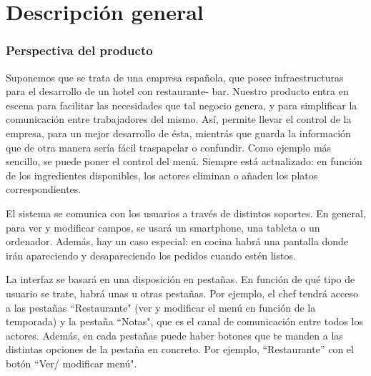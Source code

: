 \documentclass[spanish,a4paper,11pt, twoside]{report}	%
\begin{document}
\newpage
\mbox{}
\thispagestyle{empty}						%
\newpage

\setcounter{section}{0}

\part{Descripción general}
\section{Perspectiva del producto}

Suponemos que se trata de una empresa española, que posee infraestructuras para el desarrollo de un hotel con restaurante- bar. Nuestro producto entra en escena para facilitar las necesidades que tal negocio genera, y para simplificar la comunicación entre trabajadores del mismo. Así, permite llevar el control de la empresa, para un mejor desarrollo de ésta, mientrás que guarda la información que de otra manera sería fácil traspapelar o confundir. Como ejemplo más sencillo, se puede poner el control del menú. Siempre está actualizado: en función de los ingredientes disponibles, los actores eliminan o añaden los platos correspondientes. 

El sistema se comunica con los usuarios a través de distintos soportes. En general, para ver y modificar campos, se usará un smartphone, una tableta o un ordenador. Además, hay un caso especial: en cocina habrá una pantalla donde irán apareciendo y desapareciendo los pedidos cuando estén listos.

La interfaz se basará en una disposición en pestañas. En función de qué tipo de usuario se trate, habrá unas u otras pestañas. Por ejemplo, el chef tendrá acceso a las pestañas “Restaurante" (ver y modificar el menú en función de la temporada) y la pestaña “Notas", que es el canal de comunicación entre todos los actores. Además, en cada pestañas puede haber botones que te manden a las distintas opciones de la pestaña en concreto. Por ejemplo, “Restaurante'' con el botón “Ver/ modificar menú".
\end{document}
